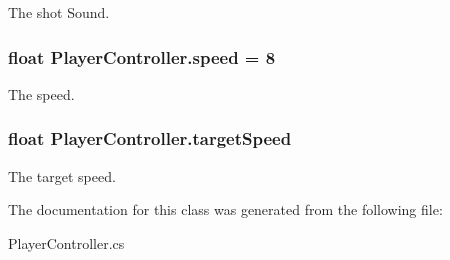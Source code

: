 The shot Sound. 

\hypertarget{classPlayerController_a0928605583f0563cd84fe43119d336ec}{
\subsubsection[{speed}]{\setlength{\rightskip}{0pt plus 5cm}float Player\-Controller.\-speed = 8}}\label{classPlayerController_a0928605583f0563cd84fe43119d336ec}


The speed. 

\hypertarget{classPlayerController_a40ea46cad3dd02224b1b5d05bb530dcc}{
\subsubsection[{target\-Speed}]{\setlength{\rightskip}{0pt plus 5cm}float Player\-Controller.\-target\-Speed}}\label{classPlayerController_a40ea46cad3dd02224b1b5d05bb530dcc}


The target speed. 



The documentation for this class was generated from the following file\-:\begin{DoxyCompactItemize}
\item 
Player\-Controller.\-cs\end{DoxyCompactItemize}
